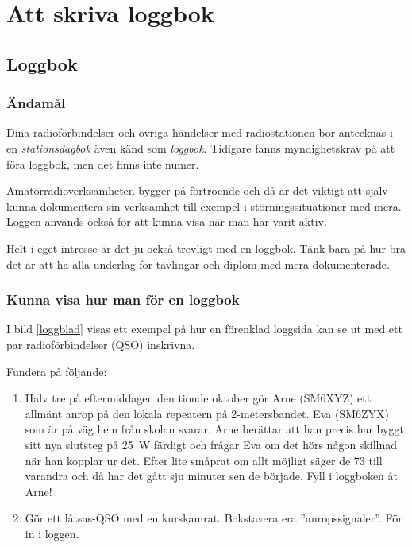 \chapter{Att skriva loggbok}

\section{Loggbok}

\subsection{Ändamål}

Dina radioförbindelser och övriga händelser med radiostationen bör
antecknas i en \emph{stationsdagbok} även känd som \emph{loggbok}.
Tidigare fanns myndighetskrav på att föra loggbok, men det finns inte numer.

Amatörradioverksamheten bygger på förtroende och då är det viktigt att själv
kunna dokumentera sin verksamhet till exempel i störningssituationer med mera.
Loggen används också för att kunna visa när man har varit aktiv.

Helt i eget intresse är det ju också trevligt med en loggbok.
Tänk bara på hur bra det är att ha alla underlag för tävlingar och diplom
med mera dokumenterade.

\subsection{Kunna visa hur man för en loggbok}

I bild \ref{loggblad} visas ett exempel på hur en förenklad loggsida kan se ut
med ett par radioförbindelser (QSO) inskrivna.

Fundera på följande:
\begin{enumerate}
\item Halv tre på eftermiddagen den tionde oktober gör Arne (SM6XYZ)
  ett allmänt anrop på den lokala repeatern på 2-metersbandet.
  Eva (SM6ZYX) som är på väg hem från skolan svarar.
  Arne berättar att han precis har byggt sitt nya slutsteg på 25~W
  färdigt och frågar Eva om det hörs någon skillnad när han kopplar ur det.
  Efter lite småprat om allt möjligt säger de 73 till varandra och då har det
  gått sju minuter sen de började.
  Fyll i loggboken åt Arne!
\item Gör ett låtsas-QSO med en kurskamrat.
  Bokstavera era ''anropssignaler''.
  För in i loggen.
\end{enumerate}

